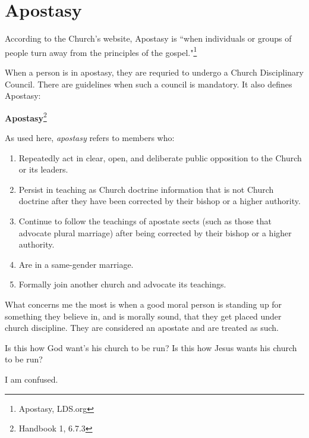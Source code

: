 \chapter{Apostasy}

According to the Church's website, Apostasy is ``when individuals or groups of people
turn away from the principles of the gospel."\footnote{Apostasy, LDS.org}

When a person is in apostasy, they are requried to undergo a Church Disciplinary
Council. There are guidelines when such a council is mandatory. It also defines
Apostasy:

\begin{displayquote}
\textbf{Apostasy}\footnote{Handbook 1, 6.7.3}

As used here, \textit{apostasy} refers to members who:

\begin{enumerate}
\item Repeatedly act in clear, open, and deliberate public opposition to the Church 
  or its leaders.

\item Persist in teaching as Church doctrine information that is not Church doctrine 
  after they have been corrected by their bishop or a higher authority.

\item Continue to follow the teachings of apostate sects (such as those that advocate 
  plural marriage) after being corrected by their bishop or a higher authority.

\item Are in a same-gender marriage.

\item Formally join another church and advocate its teachings.
\end{enumerate}
\end{displayquote}

What concerns me the most is when a good moral person is standing up for something
they believe in, and is morally sound, that they get placed under church discipline.
They are considered an apostate and are treated as such.

Is this how God want's his church to be run? Is this how Jesus wants his church to be
run?

I am confused.